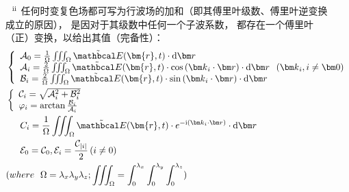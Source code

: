 \begin{corollary}
{\begin{itemize}[leftmargin=12pt]
\begin{equation}
\begin{array}{l}
					\int_\Lambda { \cos \left( {{{\bm k}_i} \cdot \bm{r} - {\omega _i}t} \right) \cdot \sin \left( {{{\bm k}_j} \cdot \bm{r} - {\omega _j}t} \right) \cdot {\mathrm d}{\bm r}} = 0 \ \  \left( i,j \in \mathbbm{N} \right) \\
					\end{array} \right.
			\end{equation}
			\item[$ \hphantom{ii}^{\mathrm{\romannumeral2}} $] 任何时变复色场都可写为行波场的加和（即其傅里叶级数、傅里叶逆变换成立的原因）， 是因对于其级数中任何一个子波系数， 都存在一个傅里叶（正）变换，以给出其值（完备性）：	
			\begin{align}
				&\left\{ \begin{array}{l}
					{{\mathcal A}_0} = \frac{1}{\Omega}\iiint_ \Omega  {\tilde {{\mathbcal E}}(\bm{r},t) \cdot {\mathrm d}{\bm r}} \\
					{{\mathcal A}_i} = \frac{2}{\Omega}\iiint_ \Omega  {\tilde {{\mathbcal E}}(\bm{r},t) \cdot \cos \left( {{\bm k}_i} \cdot {\bm r} \right) \cdot {\mathrm d}{\bm r}} \;\; \left( {{{\bm k}_i},i \ne {\bm 0}} \right) \\
					{{\mathcal B}_i} = \frac{2}{\Omega}\iiint_ \Omega  {\tilde {{\mathbcal E}}(\bm{r},t) \cdot \sin \left( {{\bm k}_i} \cdot {\bm r} \right) \cdot {\mathrm d}{\bm r}} 
					\end{array} \right. \notag \\
				&\left\{ \begin{array}{l}
					{{\mathcal C}_i} = \sqrt { {{\mathcal A}_i^2} + {{\mathcal B}_i^2} } \\
					\varphi_i = \arctan { \frac{{\mathcal B}_i}{{\mathcal A}_i} }
					\end{array} \right. \notag \\
				&\hphantom{==} C_i = \frac{1}{\Omega }\iiint_ \Omega {\tilde {{\mathbcal E}}(\bm{r},t) \cdot e^{ - {\mathrm i} \left( {{\bm k}_i} \cdot {\bm r} \right)} \cdot {\mathrm d}{\bm r}} \notag \\
				&\hphantom{==} {\mathcal E}_0 = {\mathcal C}_0 , {\mathcal E}_i = \frac{{\mathcal C}_{\left| i \right|}}{2} \left( i \neq 0 \right) \notag \\
				&( where \ \  \Omega = \lambda_x \lambda_y \lambda_z ; \iiint_ \Omega = \int_0^{\lambda_x}{ \int_0^{\lambda_y}{ \int_0^{\lambda_z}}} ) \notag \\
			\end{align}
		\end{itemize}
	}
\end{corollary}
